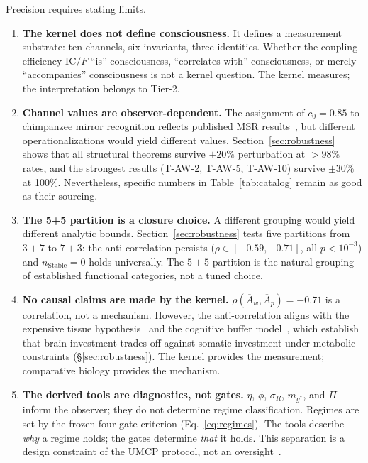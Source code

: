 \documentclass[
  aps,
  prd,
  twocolumn,
  superscriptaddress,
  nofootinbib,
  floatfix
]{revtex4-2}
\newcommand{\IC}{\mathrm{IC}}
\newcommand{\Aw}{\overline{A}_{\!w}}
\newcommand{\Ap}{\overline{A}_{\!p}}
\begin{document}
Precision requires stating limits.

\begin{enumerate}
\item \textbf{The kernel does not define consciousness.}
  It defines a measurement substrate: ten channels, six
  invariants, three identities.  Whether the coupling
  efficiency $\IC/F$ ``is'' consciousness, ``correlates with''
  consciousness, or merely ``accompanies'' consciousness is
  not a kernel question.  The kernel measures; the
  interpretation belongs to Tier-2.

\item \textbf{Channel values are observer-dependent.}
  The assignment of $c_0 = 0.85$ to chimpanzee mirror
  recognition reflects published MSR
  results~\cite{gallup1970}, but different operationalizations
  would yield different values.  Section~\ref{sec:robustness}
  shows that all structural theorems survive $\pm 20\%$
  perturbation at $> 98\%$ rates, and the strongest results
  (T-AW-2, T-AW-5, T-AW-10) survive $\pm 30\%$
  at 100\%.  Nevertheless, specific numbers in
  Table~\ref{tab:catalog} remain as good as their sourcing.

\item \textbf{The 5+5 partition is a closure choice.}
  A different grouping would yield different analytic bounds.
  Section~\ref{sec:robustness} tests five partitions from
  $3\!+\!7$ to $7\!+\!3$: the anti-correlation persists
  ($\rho \in [-0.59, -0.71]$, all $p < 10^{-3}$) and
  $n_{\mathrm{Stable}} = 0$ holds universally.  The
  $5\!+\!5$ partition is the natural grouping of established
  functional categories, not a tuned choice.

\item \textbf{No causal claims are made by the kernel.}
  $\rho(\Aw, \Ap) = -0.71$ is a correlation, not a
  mechanism.  However, the anti-correlation aligns with
  the expensive tissue hypothesis~\cite{aiello1995expensive}
  and the cognitive buffer model~\cite{isler2009expensive},
  which establish that brain investment trades off against
  somatic investment under metabolic constraints
  (\S\ref{sec:robustness}).  The kernel provides the
  measurement; comparative biology provides the mechanism.

\item \textbf{The derived tools are diagnostics, not gates.}
  $\eta$, $\phi$, $\sigma_R$, $m_{g^*}$, and $\Pi$
  inform the observer; they do not determine regime
  classification.  Regimes are set by the frozen
  four-gate criterion (Eq.~\ref{eq:regimes}).  The
  tools describe \emph{why} a regime holds; the gates
  determine \emph{that} it holds.  This separation is
  a design constraint of the UMCP protocol, not an
  oversight~\cite{paulus2025umcp}.
\end{enumerate}
\end{document}
